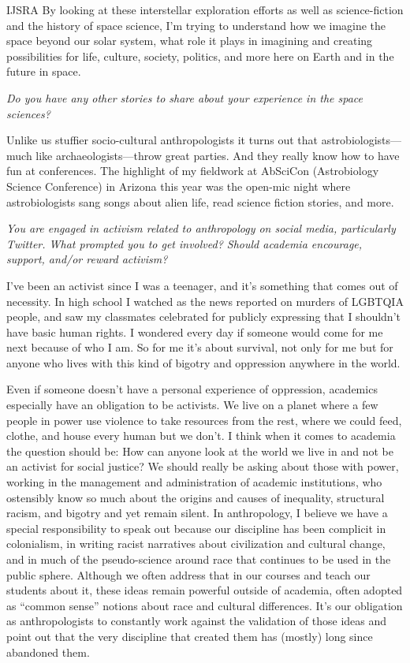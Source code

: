 \begin{labeling}{IJSRA}
	By looking at these interstellar exploration efforts as well as science-fiction and the history of space science, I’m trying to understand how we imagine the space beyond our solar system, what role it plays in imagining and creating possibilities for life, culture, society, politics, and more here on Earth and in the future in space.

	\item[IJSRA] \emph{Do you have any other stories to share about your experience in the space sciences?}

	\item[MO-R] Unlike us stuffier socio-cultural anthropologists it turns out that astrobiologists—much like archaeologists—throw great parties. And they really know how to have fun at conferences. The highlight of my fieldwork at AbSciCon (Astrobiology Science Conference) in Arizona this year was the open-mic night where astrobiologists sang songs about alien life, read science fiction stories, and more.

	\item[IJSRA] \emph{You are engaged in activism related to anthropology on social media, particularly Twitter. What prompted you to get involved? Should academia encourage, support, and/or reward activism?}

	\item[MO-R] I’ve been an activist since I was a teenager, and it’s something that comes out of necessity. In high school I watched as the news reported on murders of LGBTQIA people, and saw my classmates celebrated for publicly expressing that I shouldn’t have basic human rights. I wondered every day if someone would come for me next because of who I am. So for me it’s about survival, not only for me but for anyone who lives with this kind of bigotry and oppression anywhere in the world.

	Even if someone doesn’t have a personal experience of oppression, academics especially have an obligation to be activists. We live on a planet where a few people in power use violence to take resources from the rest, where we could feed, clothe, and house every human but we don’t. I think when it comes to academia the question should be: How can anyone look at the world we live in and not be an activist for social justice? We should really be asking about those with power, working in the management and administration of academic institutions, who ostensibly know so much about the origins and causes of inequality, structural racism, and bigotry and yet remain silent. In anthropology, I believe we have a special responsibility to speak out because our discipline has been complicit in colonialism, in writing racist narratives about civilization and cultural change, and in much of the pseudo-science around race that continues to be used in the public sphere. Although we often address that in our courses and teach our students about it, these ideas remain powerful outside of academia, often adopted as “common sense” notions about race and cultural differences. It’s our obligation as anthropologists to constantly work against the validation of those ideas and point out that the very discipline that created them has (mostly) long since abandoned them.


\end{labeling}
